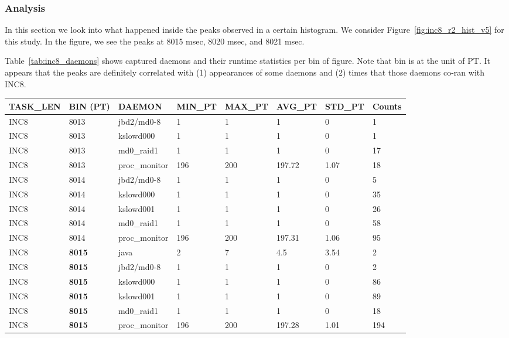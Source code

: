 \clearpage
\pagebreak
\subsubsection{Analysis}
In this section we look into what happened inside the peaks observed in a certain histogram. 
We consider Figure~\ref{fig:inc8_r2_hist_v5} for this study. 
In the figure, we see the peaks at 8015 msec, 8020 msec, and 8021 msec. 

Table~\ref{tab:inc8_daemons} shows captured daemons and their runtime statistics per bin 
of figure. Note that bin is at the unit of PT. 
It appears that the peaks are definitely correlated with (1) appearances of some daemons 
and (2) times that those daemons co-ran with INC8. 

\begin{table}[h]
\begin{center}
{\scriptsize
\begin{tabular}{l|l|l|l|l|l|l|l} \hline
TASK\_LEN  & BIN (PT) &  DAEMON   & MIN\_PT  &  MAX\_PT  &  AVG\_PT  &   STD\_PT & Counts \\ \hline
INC8     & 8013  & jbd2/md0-8    & 1     & 1     & 1     & 0     & 1\\ \hline
INC8     & 8013  & kslowd000     & 1     & 1     & 1     & 0     & 1\\ \hline
INC8     & 8013  & md0\_raid1     & 1     & 1     & 1     & 0     & 17\\ \hline
INC8     & 8013  & proc\_monitor  & 196   & 200   & 197.72        & 1.07  & 18\\ \hline \hline

INC8     & 8014  & jbd2/md0-8    & 1     & 1     & 1     & 0     & 5\\ \hline
INC8     & 8014  & kslowd000     & 1     & 1     & 1     & 0     & 35\\ \hline
INC8     & 8014  & kslowd001     & 1     & 1     & 1     & 0     & 26\\ \hline
INC8     & 8014  & md0\_raid1     & 1     & 1     & 1     & 0     & 58\\ \hline
INC8     & 8014  & proc\_monitor  & 196   & 200   & 197.31        & 1.06  & 95\\ \hline \hline

INC8     & {\bf 8015}  & java  & 2     & 7     & 4.5   & 3.54  & 2\\ \hline
INC8     & {\bf 8015}  & jbd2/md0-8    & 1     & 1     & 1     & 0     & 2\\ \hline
INC8     & {\bf 8015}  & kslowd000     & 1     & 1     & 1     & 0     & 86\\ \hline
INC8     & {\bf 8015}  & kslowd001     & 1     & 1     & 1     & 0     & 89\\ \hline
INC8     & {\bf 8015}  & md0\_raid1     & 1     & 1     & 1     & 0     & 18\\ \hline
INC8     & {\bf 8015}  & proc\_monitor  & 196   & 200   & 197.28        & 1.01  & 194\\ \hline\hline


\end{tabular}}
\end{center}
\end{table}
